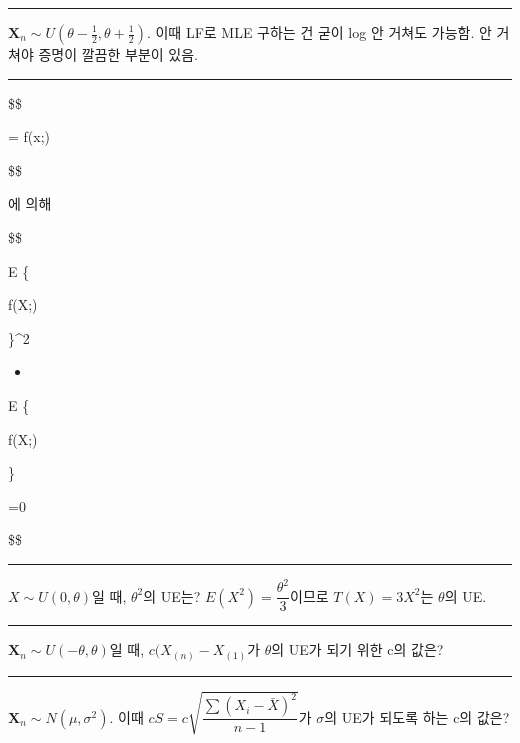 \documentclass[
]{book}
\providecommand{\tightlist}{%
  \setlength{\itemsep}{0pt}\setlength{\parskip}{0pt}}
\begin{document}
\begin{center}\rule{0.5\linewidth}{0.5pt}\end{center}

\(\pmb X_n \sim U(\theta - \tfrac{1}{2}, \theta + \tfrac{1}{2})\). 이때 LF로 MLE 구하는 건 굳이 log 안 거쳐도 가능함. 안 거쳐야 증명이 깔끔한 부분이 있음.

\begin{center}\rule{0.5\linewidth}{0.5pt}\end{center}

\$\$


= f(x;\theta)


\$\$

에 의해

\$\$

E \left\{

\dfrac{\partial}{\partial \theta} \log f(X;\theta)

\right\}\^{}2

\begin{itemize}
\tightlist
\item
\end{itemize}

E \left\{

 \log f(X;\theta)

\right\}

=0

\$\$

\begin{center}\rule{0.5\linewidth}{0.5pt}\end{center}

\(X \sim U(0, \theta)\)일 때, \(\theta^2\)의 UE는? \(E(X^2) = \dfrac{\theta^2}{3}\)이므로 \(T(X)=3X^2\)는 \(\theta\)의 UE.

\begin{center}\rule{0.5\linewidth}{0.5pt}\end{center}

\(\pmb X_n \sim U(-\theta, \theta)\)일 때, \(c(X_{(n)}-X_{(1)}\)가 \(\theta\)의 UE가 되기 위한 c의 값은?

\begin{center}\rule{0.5\linewidth}{0.5pt}\end{center}

\(\pmb X_n \sim N(\mu, \sigma^2 )\). 이때 \(cS = c \sqrt{\dfrac{\sum (X_i - \bar X)^2}{n-1}}\)가 \(\sigma\)의 UE가 되도록 하는 c의 값은?
\end{document}

